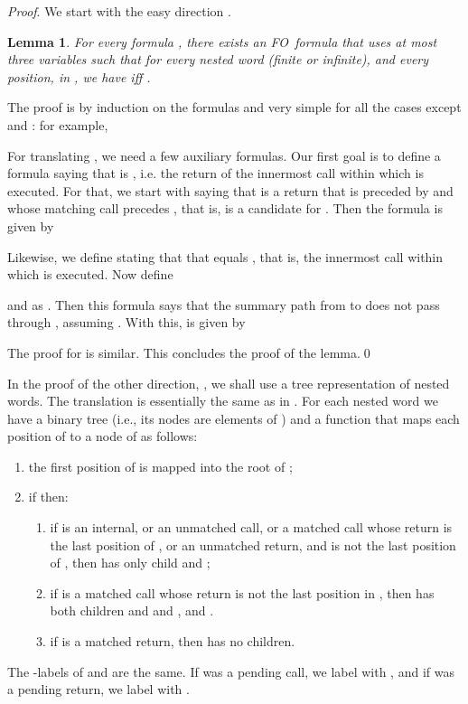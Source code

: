 \documentclass{LMCS}
\newcommand{\aProof}[2]{\vspace{2mm}{\noindent\em Proof of
#1.~}#2\qed}
\newcommand{\FO}{{\rm FO}}
\theoremstyle{plain}
\newtheorem{lemma}[theorem]{Lemma}
\theoremstyle{definition}
\newcounter{example}
\begin{document}
\medskip
\noindent
{\em Proof}.
 We start with the easy direction .

\begin{lemma}
\label{nwtl-to-fo-lemma}
For every  formula , there exists an \FO\ formula
 that uses at most three variables  such that
for every nested word  (finite or infinite), and every position,
 in , we have
 iff .
\end{lemma}

\aProof{Lemma \ref{nwtl-to-fo-lemma}}{The proof is by induction
on the formulas and very simple for all the cases except  and
: for example,
 

For translating , we need a few auxiliary formulas. Our first
goal is to define a formula  saying that  is
, i.e. the return of the innermost call within which  is
executed. For that, we start with 
 saying that  is a return that
is preceded by  and whose matching call precedes , 
that is,  is a
candidate for . Then the formula  is given by

Likewise, we define  stating that that  equals
, that is, the innermost call within which  is executed. 
Now define 
 
and  as . Then this
formula says that the summary path from  to  does not pass
through , assuming . With this,
 is given by

The proof for  is similar. This concludes
 the proof of
the lemma.}

In the proof of the other direction, , we shall
use a tree representation of nested words. 
The translation is 
essentially the same as in \cite{nested}. For each nested word  we
have a binary tree  (i.e., its nodes are elements of )
and a function  that maps each
position of  to a node of  as follows:
\begin{enumerate}[]
\item the first position of  is mapped into the root of ;
\item if  then:
\begin{enumerate}[(1)]
\item if  is an internal, or an unmatched call, or a matched call
  whose return is the last position of , or an unmatched
  return,
  and  is not the last position of
, then  has only child  and ;
\item if  is a matched call whose return is not the last position
  in , then  has both children  and
   and , and 
  .
\item
 if  is a matched return, then  has no children.
\end{enumerate}
\end{enumerate}
The -labels of  and  are the same. 
If  was a pending call, we label  with , and if 
was a pending return, we label  with . 
\end{document}
